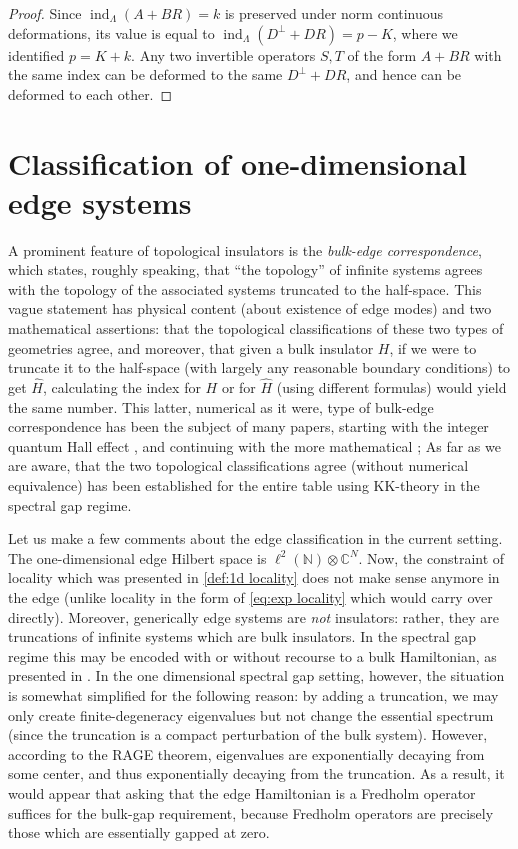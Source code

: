 \documentclass[a4paper,10pt]{article}
\numberwithin{equation}{section}
\theoremstyle{plain}
\theoremstyle{plain}
\theoremstyle{plain}
\theoremstyle{plain}
\theoremstyle{plain}
\theoremstyle{remark}
\theoremstyle{definition}
\theoremstyle{plain}
\newcommand{\NN}{\mathbb{N}}
\newcommand{\CC}{\mathbb{C}}
\newcommand{\quotes}[1]{``#1''}
\newcommand{\findex}{\operatorname{ind}}
\begin{document}
\begin{proof}
		Since $\findex_\Lambda (A+BR)=k$ is preserved under norm continuous deformations, its value is equal to $\findex_\Lambda (D^\perp + DR)=p-K$, where we identified $p=K+k.$ Any two invertible operators $S,T$ of the form $A+BR$ with the same index can be deformed to the same $D^\perp+D R$, and hence can be deformed to each other.
	\end{proof}
	
	\section{Classification of one-dimensional edge systems}\label{sec:1d edge classification}
	A prominent feature of topological insulators is the \emph{bulk-edge correspondence}, which states, roughly speaking, that \quotes{the topology} of infinite systems agrees with the topology of the associated systems truncated to the half-space. This vague statement has physical content (about existence of edge modes) and two mathematical assertions: that the topological classifications of these two types of geometries agree, and moreover, that given a bulk insulator $H$, if we were to truncate it to the half-space (with largely any reasonable boundary conditions) to get $\widehat{H}$, calculating the index for $H$ or for $\widehat{H}$ (using different formulas) would yield the same number. This latter, numerical as it were, type of bulk-edge correspondence has been the subject of many papers, starting with the integer quantum Hall effect \cite{Hatsugai1993}, and continuing with the more mathematical \cite{Schulz-BaldesKellendonkRichter2000,Elbau_Graf_2002}; As far as we are aware, that the two topological classifications agree (without numerical equivalence) has been established for the entire table using KK-theory \cite{BourneKellendonkRennie2017} in the spectral gap regime.
	
	Let us make a few comments about the edge classification in the current setting. The one-dimensional edge Hilbert space is $\ell^2(\NN)\otimes\CC^N$. Now, the constraint of locality which was presented in \cref{def:1d locality} does not make sense anymore in the edge (unlike locality in the form of \cref{eq:exp locality} which would carry over directly). Moreover, generically edge systems are \emph{not} insulators: rather, they are truncations of infinite systems which are bulk insulators. In the spectral gap regime this may be encoded with or without recourse to a bulk Hamiltonian, as presented in \cite[Section 2.4]{BSS23}. In the one dimensional spectral gap setting, however, the situation is somewhat simplified for the following reason: by adding a truncation, we may only create finite-degeneracy eigenvalues but not change the essential spectrum (since the truncation is a compact perturbation of the bulk system). However, according to the RAGE theorem, eigenvalues are exponentially decaying from some center, and thus exponentially decaying from the truncation. As a result, it would appear that asking that the edge Hamiltonian is a Fredholm operator suffices for the bulk-gap requirement, because Fredholm operators are precisely those which are essentially gapped at zero. 
	
\end{document}
